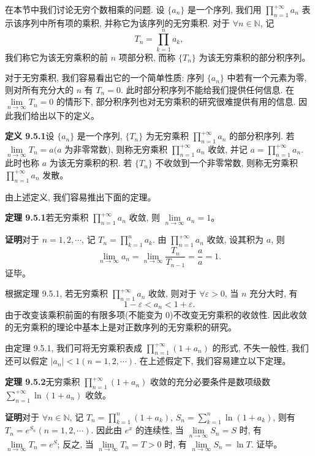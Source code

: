 \documentclass[UTF8,12pt,a4paper,fontset=fandol]{ctexart}
\begin{document}
在本节中我们讨论无穷个数相乘的问题. 设 $\{a_n\}$ 是一个序列, 我们用 $\prod\limits_{n=1}^{+\infty}a_n$ 表示该序列中所有项的乘积, 并称它为该序列的无穷乘积. 对于 $\forall n\in\mathbb{N}$, 记
\[
  T_n=\prod_{k=1}^n a_k,
\]
我们称它为该无穷乘积的前 $n$ 项部分积, 而称 $\{T_n\}$ 为该无穷乘积的部分积序列。

对于无穷乘积, 我们容易看出它的一个简单性质: 序列 $\{a_n\}$ 中若有一个元素为零, 则对所有充分大的 $n$ 有 $T_n=0$. 此时部分积序列不能给我们提供任何信息. 在 $\lim\limits_{n\to\infty}T_n=0$ 的情形下, 部分积序列也对无穷乘积的研究很难提供有用的信息. 因此我们给出以下的定义。

\noindent\textbf{定义 9.5.1}\quad 设 $\{a_n\}$ 是一个序列, $\{T_n\}$ 为无穷乘积 $\prod\limits_{n=1}^{+\infty}a_n$ 的部分积序列. 若 $\lim\limits_{n\to\infty}T_n=a(a$ 为非零常数), 则称无穷乘积 $\prod\limits_{n=1}^{+\infty}a_n$ 收敛, 并记 $a=\prod\limits_{n=1}^{+\infty}a_n$. 此时也称 $a$ 为该无穷乘积的积. 若 $\{T_n\}$ 不收敛到一个非零常数, 则称无穷乘积 $\prod\limits_{n=1}^{+\infty}a_n$ 发散。

由上述定义, 我们容易推出下面的定理。

\noindent\textbf{定理 9.5.1}\quad 若无穷乘积 $\prod\limits_{n=1}^{+\infty}a_n$ 收敛, 则 $\lim\limits_{n\to\infty}a_n=1$。

\noindent\textbf{证明}\quad 对于 $n=1,2,\cdots$, 记 $T_n=\prod\limits_{k=1}^n a_k$. 由 $\prod\limits_{n=1}^{+\infty}a_n$ 收敛, 设其积为 $a$, 则
\[
  \lim_{n\to\infty}a_n=\lim_{n\to\infty}\frac{T_n}{T_{n-1}}=\frac{a}{a}=1.
\]
证毕。

根据定理 9.5.1, 若无穷乘积 $\prod\limits_{n=1}^{+\infty}a_n$ 收敛, 则对于 $\forall\varepsilon>0$, 当 $n$ 充分大时, 有
\[
  1-\varepsilon<a_n<1+\varepsilon.
\]
由于改变该乘积前面的有限多项(不能变为 0)不改变无穷乘积的收敛性. 因此收敛的无穷乘积的理论中基本上是对正数序列的无穷乘积的研究。

由定理 9.5.1, 我们可将无穷乘积表成 $\prod\limits_{n=1}^{+\infty}(1+a_n)$ 的形式, 不失一般性, 我们还可以假定 $|a_n|<1(n=1,2,\cdots)$. 在上述假定下, 我们容易建立以下定理。

\noindent\textbf{定理 9.5.2}\quad 无穷乘积 $\prod\limits_{n=1}^{+\infty}(1+a_n)$ 收敛的充分必要条件是数项级数 $\sum\limits_{n=1}^{+\infty}\ln(1+a_n)$ 收敛。

\noindent\textbf{证明}\quad 对于 $\forall n\in\mathbb{N}$, 记 $T_n=\prod\limits_{k=1}^n(1+a_k)$, $S_n=\sum\limits_{k=1}^n\ln(1+a_k)$, 则有 $T_n=e^{S_n}(n=1,2,\cdots)$. 因此由 $e^x$ 的连续性, 当 $\lim\limits_{n\to\infty}S_n=S$ 时, 有 $\lim\limits_{n\to\infty}T_n=e^S$; 反之, 当 $\lim\limits_{n\to\infty}T_n=T>0$ 时, 有 $\lim\limits_{n\to\infty}S_n=\ln T$. 证毕。
\end{document}
